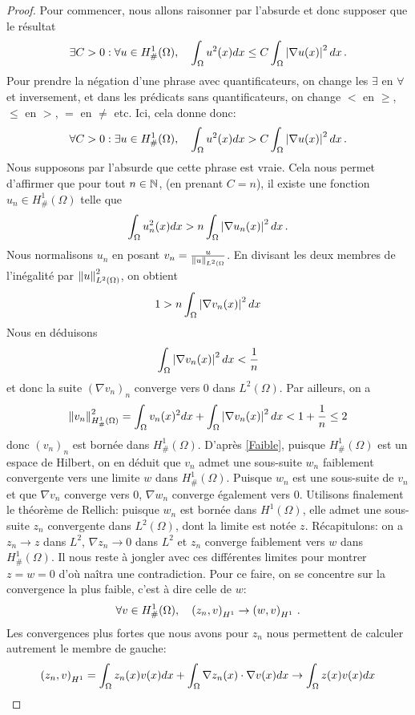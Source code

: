 \documentclass[]{article}
\begin{document}
\begin{proof}
	Pour commencer, nous allons raisonner par l'absurde et donc supposer que le résultat 
	\[\exists C > 0 : \forall u \in H^1_{\#}(\Omega), \quad  \int_{\Omega} u^2(x) dx \leq C \int_{\Omega} \left\lvert \nabla u(x) \right\rvert^2dx\,.\]
	Pour prendre la négation d'une phrase avec quantificateurs, on change les $\exists$ en $\forall$ et inversement, et dans les prédicats sans quantificateurs, on change $<$ en $\geq$, $\leq$ en $>$, $=$ en $\neq$ etc. Ici, cela donne donc:
	\[\forall C > 0 : \exists u \in H^1_{\#}(\Omega), \quad  \int_{\Omega} u^2(x) dx > C \int_{\Omega} \left\lvert \nabla u(x) \right\rvert^2dx\,.\]
	Nous supposons par l'absurde que cette phrase est vraie. Cela nous permet d'affirmer que pour tout $n \in \mathbb{N}$, (en prenant $C = n$), il existe une fonction $u_n \in  H^1_{\#}(\Omega)$ telle que 
	\[\int_{\Omega} u_n^2(x) dx > n \int_{\Omega} \left\lvert \nabla u_n(x) \right\rvert^2dx\,.\]
	Nous normalisons $u_n$ en posant $v_n = \frac{u}{\left\|u\right\|_{L^2(\Omega}}$. En divisant les deux membres de l'inégalité par $\left\|u\right\|_{L^2(\Omega)}^2$, on obtient 
	\[1 > n \int_{\Omega} \left\lvert \nabla v_n(x) \right\rvert^2 dx \]
	Nous en déduisons 
	\[\int_{\Omega} \left\lvert \nabla v_n(x) \right\rvert^2 dx < \frac{1}{n}\]
	et donc la suite $(\nabla v_n)_n$ converge vers $0$ dans $L^2(\Omega)$. Par ailleurs, on a 
	\[\left\|v_n\right\|_{H^1_{\#}(\Omega)}^2 = \int_{\Omega} v_n(x)^2 dx +  \int_{\Omega} \left\lvert \nabla v_n(x) \right\rvert^2 dx < 1 + \frac{1}{n} \leq 2\]
	donc $(v_n)_n$ est bornée dans $H^1_{\#}(\Omega)$. D'après \autoref{Faible}, puisque $H^1_{\#}(\Omega)$ est un espace de Hilbert, on en déduit que $v_n$ admet une sous-suite $w_n$ faiblement convergente vers une limite $w$ dans $H^1_{\#}(\Omega)$.  Puisque $w_n$ est une sous-suite de $v_n$ et que $\nabla v_n$ converge vers $0$, $\nabla w_n$ converge également vers $0$. Utilisons finalement le théorème de Rellich: puisque  $w_n$ est bornée dans $H^1(\Omega)$, elle admet une sous-suite $z_n$ convergente dans $L^2(\Omega)$, dont la limite est notée $z$. Récapitulons: on a $z_n \to z$ dans $L^2$, $\nabla z_n \to 0$ dans $L^2$ et $z_n$ converge faiblement vers $w$ dans $H^{1}_{\#}(\Omega)$. Il nous reste à jongler avec ces différentes limites pour montrer $z = w = 0$ d'où naîtra une contradiction. Pour ce faire, on se concentre sur la convergence la plus faible, c'est à dire celle de $w$: 
	\[\forall v \in H^{1}_{\#}(\Omega),\quad \left( z_n,v\right)_{H^1} \to \left( w,v\right)_{H^1}\,.\]
	Les convergences plus fortes que nous avons pour $z_n$ nous permettent de calculer autrement le membre de gauche:
	\[\left( z_n,v\right)_{H^1} = \int_{\Omega} z_n(x) v(x)dx + \int_{\Omega} \nabla z_n(x) \cdot \nabla v(x)dx \to \int_{\Omega} z(x)v(x) dx\]
\end{proof}
\end{document}
